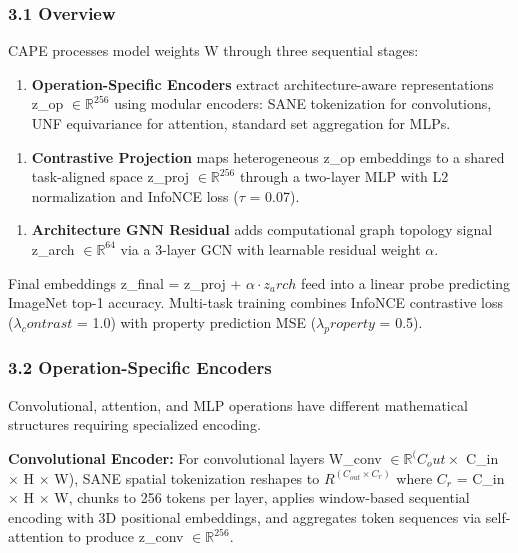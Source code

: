 
\subsubsection{3.1 Overview}

CAPE processes model weights W through three sequential stages:

\begin{enumerate}
\item \textbf{Operation-Specific Encoders} extract architecture-aware representations z\_op $\in \mathbb{R}^256$ using modular encoders: SANE tokenization for convolutions, UNF equivariance for attention, standard set aggregation for MLPs.
\end{enumerate}

\begin{enumerate}
\item \textbf{Contrastive Projection} maps heterogeneous z\_op embeddings to a shared task-aligned space z\_proj $\in \mathbb{R}^256$ through a two-layer MLP with L2 normalization and InfoNCE loss ($\tau$ = 0.07).
\end{enumerate}

\begin{enumerate}
\item \textbf{Architecture GNN Residual} adds computational graph topology signal z\_arch $\in \mathbb{R}^64$ via a 3-layer GCN with learnable residual weight $\alpha$.
\end{enumerate}

Final embeddings z\_final = z\_proj + $\alpha \cdot z_arch$ feed into a linear probe predicting ImageNet top-1 accuracy. Multi-task training combines InfoNCE contrastive loss ($\lambda _contrast$ = 1.0) with property prediction MSE ($\lambda _property$ = 0.5).

\subsubsection{3.2 Operation-Specific Encoders}

Convolutional, attention, and MLP operations have different mathematical structures requiring specialized encoding.

\textbf{Convolutional Encoder:} For convolutional layers W\_conv $\in \mathbb{R}^(C_out \times$ C\_in $\times$ H $\times$ W), SANE spatial tokenization reshapes to $R^{(C_{out} \times C_r)}$ where $C_r$ = C\_in $\times$ H $\times$ W, chunks to 256 tokens per layer, applies window-based sequential encoding with 3D positional embeddings, and aggregates token sequences via self-attention to produce z\_conv $\in \mathbb{R}^256$.

